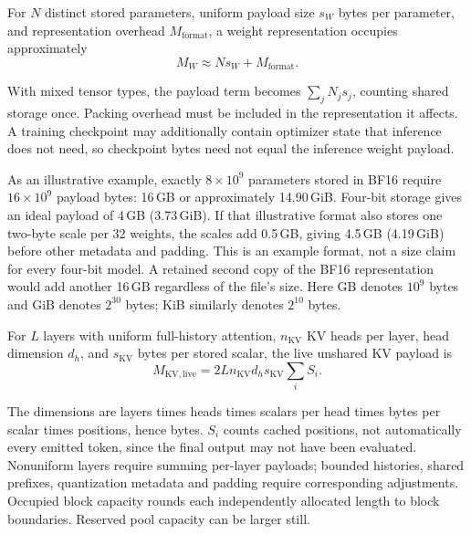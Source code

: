 For \(N\) distinct stored parameters, uniform payload size \(s_W\)
bytes per parameter, and representation overhead \(M_{\mathrm{format}}\),
a weight representation occupies approximately
\begin{equation}
\label{eq:weight-payload}
 M_W \approx Ns_W + M_{\mathrm{format}}.
\end{equation}

With mixed tensor types, the payload term becomes
\(\sum_j N_j s_j\), counting shared storage once.  Packing overhead must
be included in the representation it affects.  A training checkpoint
may additionally contain optimizer state that inference does not need,
so checkpoint bytes need not equal the inference weight payload.

As an illustrative example, exactly \(8\times10^9\) parameters stored
in BF16 require \(16\times10^9\) payload bytes: 16\,GB or approximately
14.90\,GiB.  Four-bit storage gives an ideal payload of 4\,GB
(3.73\,GiB).  If that illustrative format also stores one two-byte scale
per 32 weights, the scales add 0.5\,GB, giving 4.5\,GB (4.19\,GiB)
before other metadata and padding.  This is an example format, not a
size claim for every four-bit model.  A retained second copy of the
BF16 representation would add another 16\,GB regardless of the file's
size.  Here GB denotes \(10^9\) bytes and GiB denotes \(2^{30}\) bytes;
KiB similarly denotes \(2^{10}\) bytes.

For \(L\) layers with uniform full-history attention, \(n_{\mathrm{KV}}\)
KV heads per layer, head dimension \(d_h\), and \(s_{\mathrm{KV}}\)
bytes per stored scalar, the live unshared KV payload is
\begin{equation}
\label{eq:kv-live-payload}
 M_{\mathrm{KV,live}}=
 2L n_{\mathrm{KV}}d_h s_{\mathrm{KV}}\sum_i S_i.
\end{equation}

The dimensions are layers times heads times scalars per head times
bytes per scalar times positions, hence bytes.  \(S_i\) counts cached
positions, not automatically every emitted token, since the final
output may not have been evaluated.  Nonuniform layers require summing
per-layer payloads; bounded histories, shared prefixes, quantization
metadata and padding require corresponding adjustments.  Occupied block
capacity rounds each independently allocated length to block boundaries.
Reserved pool capacity can be larger still.

